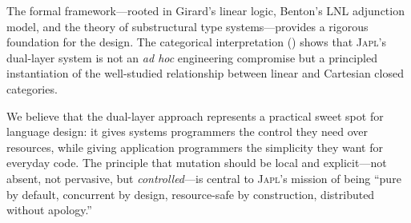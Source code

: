 \documentclass[11pt]{article}
\newcommand{\JAPL}{\textsc{Japl}}
\begin{document}
The formal framework---rooted in Girard's linear logic, Benton's
LNL adjunction model, and the theory of substructural type
systems---provides a rigorous foundation for the design.  The
categorical interpretation () shows that
\JAPL{}'s dual-layer system is not an \emph{ad hoc} engineering
compromise but a principled instantiation of the well-studied
relationship between linear and Cartesian closed categories.

We believe that the dual-layer approach represents a practical sweet
spot for language design: it gives systems programmers the control they
need over resources, while giving application programmers the
simplicity they want for everyday code.  The principle that mutation
should be local and explicit---not absent, not pervasive, but
\emph{controlled}---is central to \JAPL{}'s mission of being ``pure
by default, concurrent by design, resource-safe by construction,
distributed without apology.''



\end{document}
